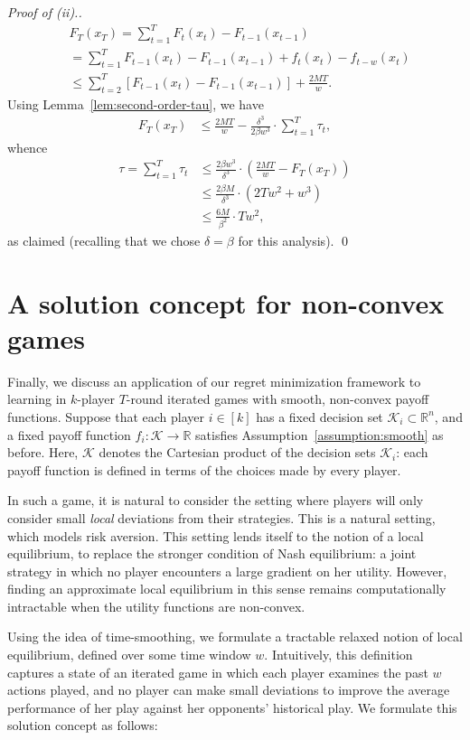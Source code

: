 \documentclass{article}
\newcommand{\K}{\ensuremath{\mathcal K}}
\newcommand{\pa}[1]{\left(#1\right)}
\newcommand{\bra}[1]{\left[#1\right]}
\newcommand{\R}{\mathbb{R}}
\renewcommand{\K}{\mathcal{K}}
\begin{document}
\begin{proof}[Proof of (ii).]
\begin{align*}
&F_T(x_T) = \sum_{t=1}^{T} F_{t}(x_{t}) - F_{t-1}(x_{t-1}) \\
&= \sum_{t=1}^{T} F_{t-1}(x_t) - F_{t-1}(x_{t-1}) + f_t(x_t) - f_{t-w}(x_t) \\
&\leq \sum_{t=2}^{T} \bra{ F_{t-1}(x_t) - F_{t-1}(x_{t-1}) } + \frac{2MT}{w}.
\end{align*}
Using Lemma~\ref{lem:second-order-tau}, we have
\begin{align*}
F_T(x_T) &\leq \frac{2MT}{w} - \frac{\delta^3}{2\beta w^3} \cdot \sum_{t=1}^T \tau_t,
\end{align*}
whence
\begin{align*}
\tau = \sum_{t=1}^T \tau_t &\leq \frac{2\beta w^3}{\delta^3} \cdot \pa{ \frac{2MT}{w} - F_T(x_T) } \\
&\leq \frac{2\beta M}{\delta^3} \cdot \pa{2Tw^2 + w^3} \\
&\leq \frac{6 M}{\beta^2} \cdot Tw^2,
\end{align*}
as claimed (recalling that we chose $\delta = \beta$ for this analysis).
\qed
\end{proof}
 
\section{A solution concept for non-convex games}

Finally, we discuss an application of our regret minimization framework to learning in $k$-player $T$-round iterated games with smooth, non-convex payoff functions. Suppose that each player $i \in [k]$ has a fixed decision set $\K_i \subset \R^n$, and a fixed payoff function $f_i : \K \rightarrow \R$ satisfies Assumption~\ref{assumption:smooth} as before. Here, $\K$ denotes the Cartesian product of the decision sets $\K_i$: each payoff function is defined in terms of the choices made by every player.

In such a game, it is natural to consider the setting where players will only consider small \emph{local} deviations from their strategies. This is a natural setting, which models risk aversion. This setting lends itself to the notion of a local equilibrium, to replace the stronger condition of Nash equilibrium: a joint strategy in which no player encounters a large gradient on her utility. However, finding an approximate local equilibrium in this sense remains computationally intractable when the utility functions are non-convex.

Using the idea of time-smoothing, we formulate a tractable relaxed notion of local equilibrium, defined over some time window $w$. Intuitively, this definition captures a state of an iterated game in which each player examines the past $w$ actions played, and no player can make small deviations to improve the average performance of her play against her opponents' historical play. We formulate this solution concept as follows:
\end{document}
